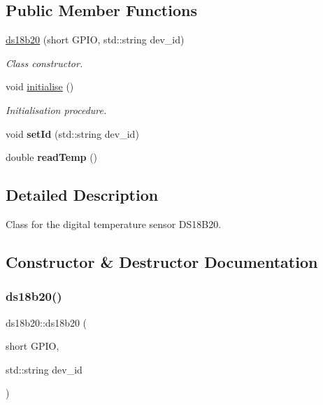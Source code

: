 \subsection*{Public Member Functions}
\begin{DoxyCompactItemize}
\item 
\mbox{\hyperlink{classds18b20_a2feec12ddec6572d29db8b0fe7181bab}{ds18b20}} (short G\+P\+IO, std\+::string dev\+\_\+id)
\begin{DoxyCompactList}\small\item\em Class constructor. \end{DoxyCompactList}\item 
void \mbox{\hyperlink{classds18b20_a222d770b98aa7c0d6ae27da9756c8979}{initialise}} ()
\begin{DoxyCompactList}\small\item\em Initialisation procedure. \end{DoxyCompactList}\item 
\mbox{\label{classds18b20_ad67e2e862e0d89ba93ee873e3977bd7b}} 
void {\bfseries set\+Id} (std\+::string dev\+\_\+id)
\item 
\mbox{\label{classds18b20_a479caadfcbf4b1d0fd0867a440900e7d}} 
double {\bfseries read\+Temp} ()
\end{DoxyCompactItemize}


\subsection{Detailed Description}
Class for the digital temperature sensor D\+S18\+B20. 



\subsection{Constructor \& Destructor Documentation}
\mbox{\label{classds18b20_a2feec12ddec6572d29db8b0fe7181bab}} 
\subsubsection{\texorpdfstring{ds18b20()}{ds18b20()}}
{\footnotesize\ttfamily ds18b20\+::ds18b20 (\begin{DoxyParamCaption}\item[{short}]{G\+P\+IO,  }\item[{std\+::string}]{dev\+\_\+id }\end{DoxyParamCaption})}



